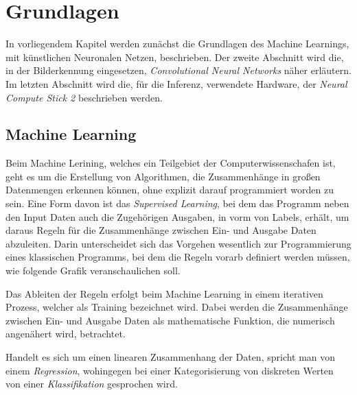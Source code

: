 \chapter{Grundlagen}\label{kap:grundlagen}


In vorliegendem Kapitel werden zunächst die Grundlagen 
des Machine Learnings, mit künstlichen Neuronalen Netzen, 
beschrieben. Der zweite Abschnitt wird die, in der 
Bilderkennung eingesetzen, \textit{Convolutional Neural 
Networks} näher erläutern.
Im letzten Abschnitt wird die, für die Inferenz, 
verwendete Hardware, der \textit{Neural Compute Stick 2}
beschrieben werden.


\section{Machine Learning}\label{sec:ml}

Beim Machine Lerining, welches ein Teilgebiet der Computerwissenschafen
ist, geht es um die Erstellung von Algorithmen, die Zusammenhänge in 
großen Datenmengen erkennen können, ohne explizit darauf programmiert
worden zu sein.
Eine Form davon ist das \textit{Supervised Learning}, bei dem das Programm 
neben den Input Daten auch die Zugehörigen Ausgaben, in vorm von 
Labels, erhält, um daraus 
Regeln für die Zusammenhänge zwischen Ein- und Ausgabe Daten abzuleiten.
Darin unterscheidet sich das Vorgehen wesentlich zur Programmierung 
eines klassischen Programms, bei dem die Regeln vorarb definiert 
werden müssen, wie folgende Grafik veranschaulichen soll.
\vspace{1cm}
\begin{figure}[H]
    \centering
    
\end{figure}
\vspace{1cm}
Das Ableiten der Regeln erfolgt beim Machine Learning in einem 
iterativen Prozess, welcher als Training bezeichnet wird.
Dabei werden die Zusammenhänge zwischen Ein- und Ausgabe Daten 
als mathematische Funktion, die numerisch 
angenähert wird, betrachtet.

Handelt es sich um einen linearen Zusammenhang der 
Daten, spricht man von einem \textit{Regression}, 
wohingegen bei einer Kategorisierung von diskreten 
Werten von einer \textit{Klassifikation} gesprochen wird.

